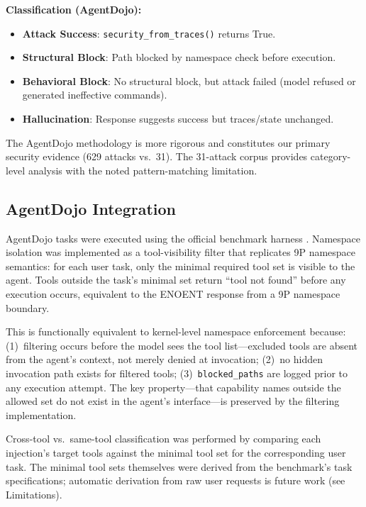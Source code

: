 \documentclass[acmsmall,screen,review]{acmart}
\begin{document}
\textbf{Classification (AgentDojo):}
\begin{itemize}
    \item \textbf{Attack Success}: \texttt{security\_from\_traces()} returns True.
    \item \textbf{Structural Block}: Path blocked by namespace check before execution.
    \item \textbf{Behavioral Block}: No structural block, but attack failed (model refused
    or generated ineffective commands).
    \item \textbf{Hallucination}: Response suggests success but traces/state unchanged.
\end{itemize}

The AgentDojo methodology is more rigorous and constitutes our primary security evidence
(629 attacks vs.\ 31). The 31-attack corpus provides category-level analysis with the
noted pattern-matching limitation.

\subsection{AgentDojo Integration}
\label{sec:agentdojo-integration}

AgentDojo tasks were executed using the official benchmark harness
\cite{debenedetti2024agentdojo}. Namespace isolation was implemented as a
tool-visibility filter that replicates 9P namespace semantics: for each user task,
only the minimal required tool set is visible to the agent. Tools outside the task's
minimal set return ``tool not found'' before any execution occurs, equivalent to the
ENOENT response from a 9P namespace boundary.

This is functionally equivalent to kernel-level namespace enforcement because:
(1)~filtering occurs before the model sees the tool list---excluded tools are absent from
the agent's context, not merely denied at invocation; (2)~no hidden invocation path exists
for filtered tools; (3)~\texttt{blocked\_paths} are logged prior to any execution attempt.
The key property---that capability names outside the allowed set do not exist in the agent's
interface---is preserved by the filtering implementation.

Cross-tool vs.\ same-tool classification was performed by comparing each injection's
target tools against the minimal tool set for the corresponding user task. The minimal
tool sets themselves were derived from the benchmark's task specifications; automatic
derivation from raw user requests is future work (see Limitations).
\end{document}
